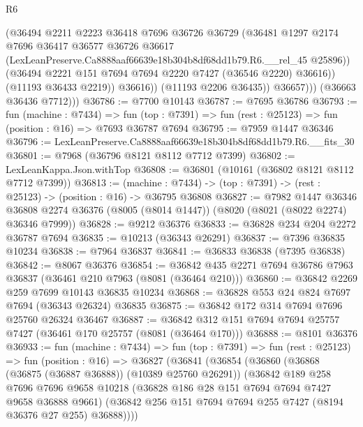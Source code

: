 \begin{lexlean}{R6}
\begin{coremodule}
                      (@36494
                        @2211
                        @2223
                        @36418
                        @7696
                        @36726
                        @36729
                        (@36481
                          @1297
                          @2174
                          @7696
                          @36417
                          @36577
                          @36726
                          @36617
                          (LexLeanPreserve.Ca8888aaf66639e18b304b8df68dd1b79.R6.__rel_45 @25896))
                        (@36494 @2221 @151 @7694 @7694 @2220 @7427 (@36546 @2220) @36616))
                      (@11193 @36433 @2219))
                    @36616))
                (@11193 @2206 @36435))
              @36657)))
        (@36663 @36436 @7712)))
@36786 := @7700 @10143
@36787 := @7695 @36786
@36793 := fun (machine : @7434) =>
  fun (top : @7391) => fun (rest : @25123) => fun (position : @16) => @7693 @36787 @7694
@36795 := @7959 @1447 @36346
@36796 := LexLeanPreserve.Ca8888aaf66639e18b304b8df68dd1b79.R6.__fits_30
@36801 := @7968 (@36796 @8121 @8112 @7712 @7399)
@36802 := LexLeanKappa.Json.withTop
@36808 := @36801 (@10161 (@36802 @8121 @8112 @7712 @7399))
@36813 := (machine : @7434) -> (top : @7391) -> (rest : @25123) -> (position : @16) -> @36795 @36808
@36827 := @7982
    @1447
    @36346
    @36808
    @2274
    @36376
    (@8005 (@8014 @1447))
    (@8020 (@8021 (@8022 @2274) @36346 @7999))
@36828 := @9212 @36376
@36833 := @36828 @234 @204 @2272 @36787 @7694
@36835 := @10213 (@36343 @26291)
@36837 := @7396 @36835 @10234
@36838 := @7964 @36837
@36841 := @36833 @36838 (@7395 @36838)
@36842 := @8067 @36376
@36854 := @36842 @435 @2271 @7694 @36786 @7963 @36837 (@36461 @210 @7963 (@8081 (@36464 @210)))
@36860 := @36842 @2269 @259 @7699 @10143 @36835 @10234
@36868 := @36828 @553 @24 @824 @7697 @7694 (@36343 @26324) @36835
@36875 := @36842 @172 @314 @7694 @7696 @25760 @26324 @36467
@36887 := @36842 @312 @151 @7694 @7694 @25757 @7427 (@36461 @170 @25757 (@8081 (@36464 @170)))
@36888 := @8101 @36376
@36933 := fun (machine : @7434) =>
  fun (top : @7391) =>
  fun (rest : @25123) =>
  fun (position : @16) =>
  @36827
    (@36841
      (@36854
        (@36860
          (@36868 (@36875 (@36887 @36888)) (@10389 @25760 @26291))
          (@36842
            @189
            @258
            @7696
            @7696
            @9658
            @10218
            (@36828 @186 @28 @151 @7694 @7694 @7427 @9658 @36888 @9661)
            (@36842 @256 @151 @7694 @7694 @255 @7427 (@8194 @36376 @27 @255) @36888))))

\end{coremodule}
\end{lexlean}
